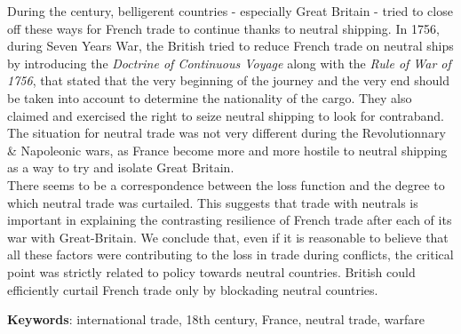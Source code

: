 \documentclass[12pt,a4paper,notitlepage]{article}
\begin{document}
During the century, belligerent countries - especially Great Britain - tried to close off these ways for French trade to continue thanks to neutral shipping.
In 1756, during Seven Years War, the British tried to reduce French trade on neutral ships by introducing the \textit{Doctrine of Continuous Voyage} along with the \textit{Rule of War of 1756}, that stated that the very beginning of the journey and the very end should be taken into account to determine the nationality of the cargo.
They also claimed and exercised the right to seize neutral shipping to look for contraband.
The situation for neutral trade was not very different during the Revolutionnary \& Napoleonic wars, as France become more and more hostile to neutral shipping as a way to try and isolate Great Britain.\\
There seems to be a correspondence between the loss function and the degree to which neutral trade was curtailed. This suggests  that trade with neutrals is important in explaining the contrasting resilience of French trade after each of its war with Great-Britain.
We conclude that, even if it is reasonable to believe that all these factors were contributing to the loss in trade during conflicts, the critical point was strictly related to policy towards neutral countries.
British could efficiently curtail French trade only by blockading neutral countries.





\textbf{Keywords}: international trade, 18th century, France, neutral trade, warfare

\pagebreak

\renewcommand{\baselinestretch}{1.0}\normalsize


\end{document}
